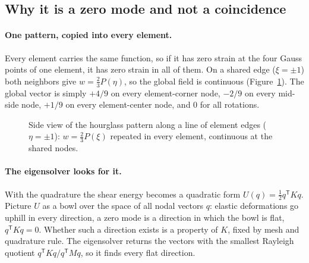 \documentclass[11pt]{article}
\begin{document}
\subsection{Why it is a zero mode and not a coincidence}
\paragraph{One pattern, copied into every element.} Every element carries the same
function, so if it has zero strain at the four Gauss points of one element, it has
zero strain in all of them. On a shared edge ($\xi = \pm 1$) both neighbors give
$w = \tfrac23 P(\eta)$, so the global field is continuous (Figure~\ref{fig:side_view}).
The global vector is simply $+4/9$ on every element-corner node, $-2/9$ on every
mid-side node, $+1/9$ on every element-center node, and $0$ for all rotations.

\begin{figure}[htbp]
\centering
{}
\caption{Side view of the hourglass pattern along a line of element edges
($\eta = \pm 1$): $w = \frac23 P(\xi)$ repeated in every element, continuous at the
shared nodes.}
\label{fig:side_view}
\end{figure}

\paragraph{The eigensolver looks for it.} With the quadrature the shear energy
becomes a quadratic form $U(q) = \frac12 q^\mathsf{T} K q$. Picture $U$ as a bowl over
the space of all nodal vectors $q$: elastic deformations go uphill in every direction,
a zero mode is a direction in which the bowl is flat, $q^\mathsf{T} K q = 0$. Whether
such a direction exists is a property of $K$, fixed by mesh and quadrature rule. The
eigensolver returns the vectors with the smallest Rayleigh quotient
$q^\mathsf{T} K q / q^\mathsf{T} M q$, so it finds every flat direction.
\end{document}
